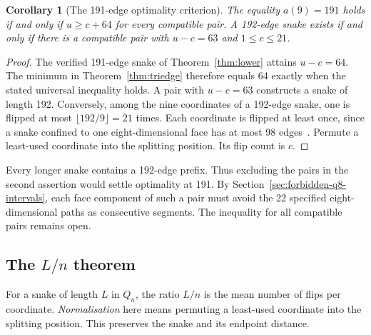 \documentclass[11pt,a4paper]{article}
\newtheorem{corollary}[theorem]{Corollary}
\theoremstyle{definition}
\theoremstyle{remark}
\newcommand{\Q}{Q}
\begin{document}
\begin{corollary}[The 191-edge optimality criterion]\label{cor:triedge-191}
The equality $a(9)=191$ holds if and only if $u\ge c+64$ for every
compatible pair. A 192-edge snake exists if and only if there is a
compatible pair with $u-c=63$ and $1\le c\le21$.
\end{corollary}
\begin{proof}
The verified 191-edge snake of Theorem~\ref{thm:lower} attains $u-c=64$.
The minimum in Theorem~\ref{thm:triedge} therefore equals 64 exactly
when the stated universal inequality holds. A pair with $u-c=63$
constructs a snake of length 192. Conversely, among the nine coordinates
of a 192-edge snake, one is flipped at most $\lfloor192/9\rfloor=21$
times. Each coordinate is flipped at least once, since a snake confined
to one eight-dimensional face has at most 98 edges~\cite{ostergard}.
Permute a least-used coordinate into the splitting position. Its flip
count is $c$.
\end{proof}

Every longer snake contains a 192-edge prefix. Thus excluding the
pairs in the second assertion would settle optimality at 191.
By Section~\ref{sec:forbidden-q8-intervals}, each face component of such
a pair must avoid the 22 specified eight-dimensional paths as consecutive
segments. The inequality for all compatible pairs remains open.

\subsection{The \texorpdfstring{$L/n$}{L/n} theorem}\label{sec:length-normalization}
For a snake of length $L$ in $\Q_n$, the ratio $L/n$ is the mean number
of flips per coordinate. \emph{Normalisation} here means permuting a
least-used coordinate into the splitting position. This preserves the
snake and its endpoint distance.
\end{document}
